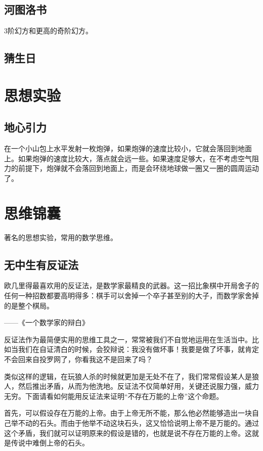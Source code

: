 \documentclass[export, 12pt, letterpaper]{ctexrep}
\newenvironment{shadedquotation}
 {\begin{shaded*}
  \quoting[leftmargin=5pt, rightmargin=5pt, vskip=0pt]
 }
 {\endquoting
 \end{shaded*}
}
\begin{document}
\section{河图洛书}
3阶幻方和更高的奇阶幻方。


\section{猜生日}




\chapter{思想实验}


\section{地心引力}
在一个小山包上水平发射一枚炮弹，如果炮弹的速度比较小，它就会落回到地面上。如果炮弹的速度比较大，落点就会远一些。如果速度足够大，在不考虑空气阻力的前提下，炮弹就不会落回到地面上，而是会环绕地球做一圈又一圈的圆周运动了。



\chapter{思维锦囊}


著名的思想实验，常用的数学思维。

\section{无中生有反证法}
\begin{shadedquotation}
\noindent
欧几里得最喜欢用的反证法，是数学家最精良的武器。这一招比象棋中开局舍子的任何一种招数都要高明得多：棋手可以舍掉一个卒子甚至别的大子，而数学家舍掉的是整个棋局。
\noindent

\noindent
——《一个数学家的辩白》
\end{shadedquotation}


反证法作为最简便实用的思维工具之一，常常被我们不自觉地运用在生活当中。比如当我们在自证清白的时候，会狡辩说：我没有做坏事！我要是做了坏事，就肯定不会回来自投罗网了，你看我这不是回来了吗？

类似这样的逻辑，在玩狼人杀的时候就更加是无处不在了，我们常常假设某人是狼人，然后推出矛盾，从而为他洗地。反证法不仅简单好用，关键还说服力强，威力无穷。下面请看如何能用反证法来证明“不存在万能的上帝”这个命题。

首先，可以假设存在万能的上帝。由于上帝无所不能，那么他必然能够造出一块自己举不动的石头。而由于他举不动这块石头，这又恰恰说明上帝不是万能的。通过这个矛盾，我们就可以证明原来的假设是错的，也就是说不存在万能的上帝。这就是传说中难倒上帝的石头。
\end{document}
